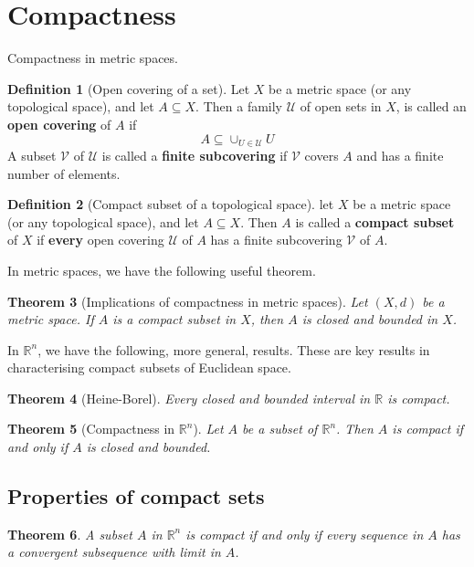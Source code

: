 \documentclass[10pt, oneside, reqno]{amsart}
\theoremstyle{plain}%
\newtheorem{thm}{Theorem}[section]
\theoremstyle{definition}
\newtheorem{defn}[thm]{Definition}
\theoremstyle{remark}
\newcommand{\R}{\mathbb{R}}
\newcommand{\met}{(X,d)}
\begin{document}
\section{Compactness} %
\label{sec:compactness}
Compactness in metric spaces.

\begin{defn}[Open covering of a set]
    Let $X$ be a metric space (or any topological space), and let $A \subseteq X$.  Then a family $\mathcal{U}$ of open sets in $X$, is called an \textbf{open covering} of $A$ if \[
        A \subseteq \cup_{U \in \mathcal{U}} U
    \]
A subset $\mathcal{V}$ of $\mathcal{U}$ is called a \textbf{finite subcovering} if $\mathcal{V}$ covers $A$ and has a finite number of elements.
\end{defn}

\begin{defn}[Compact subset of a topological space]
    let $X$ be a metric space (or any topological space), and let $A \subseteq X$.  Then $A$ is called a \textbf{compact subset} of $X$ if \textbf{every} open covering $\mathcal{U}$ of $A$ has a finite subcovering $\mathcal{V}$ of $A$. 
\end{defn}

In metric spaces, we have the following useful theorem.

\begin{thm}[Implications of compactness in metric spaces]
    Let $\met$ be a metric space.  If $A$ is a compact subset in $X$, then $A$ is closed and bounded in $X$.  
\end{thm}

In $\R^n$, we have the following, more general, results.  These are key results in characterising compact subsets of Euclidean space.

\begin{thm}[Heine-Borel]
    Every closed and bounded interval in $\R$ is compact.
\end{thm}

\begin{thm}[Compactness in $\R^n$]
    Let $A$ be a subset of $\R^n$.  Then $A$ is compact if and only if $A$ is closed and bounded.
\end{thm}

\subsection{Properties of compact sets} %
\label{sub:properties_of_compact_sets}
\begin{thm}
    A subset $A$ in $\R^n$ is compact if and only if every sequence in $A$ has a convergent subsequence with limit in $A$.
\end{thm}
\end{document}
